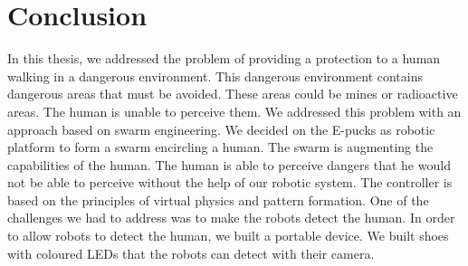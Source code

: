 \documentclass[oneside, a4paper, 12pt]{memoir}
\begin{document}
\chapter{Conclusion}
	\label{chap:conclusion}

	In this thesis, we addressed the problem of providing a protection to a human walking in a dangerous environment. This dangerous environment contains dangerous areas that must be avoided. These areas could be mines or radioactive areas. The human is unable to perceive them. We addressed this problem with an approach based on swarm engineering. We decided on the E-pucks \citep{mondada2009puck} as robotic platform to form a swarm encircling a human. The swarm is augmenting the capabilities of the human. The human is able to perceive dangers that he would not be able to perceive without the help of our robotic system. The controller is based on the principles of virtual physics and pattern formation. One of the challenges we had to address was to make the robots detect the human. In order to allow robots to detect the human, we built a portable device. We built shoes with coloured LEDs that the robots can detect with their camera.
	
\end{document}

